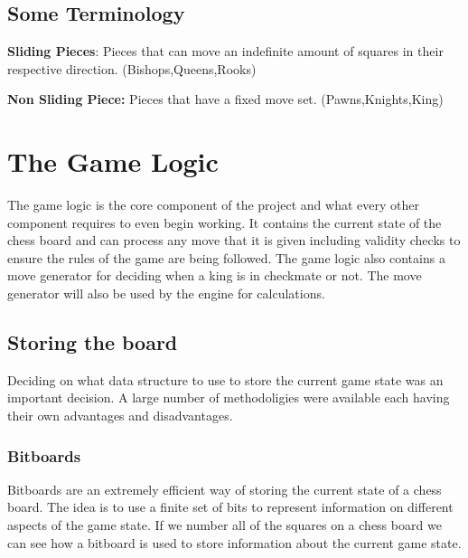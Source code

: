 \documentclass[11pt]{report}
\begin{document}
\tableofcontents

\section{Some Terminology}

\textbf{Sliding Pieces}: Pieces that can move an indefinite amount of squares in their respective direction. (Bishops,Queens,Rooks) \newline

\textbf{Non Sliding Piece:} Pieces that have a fixed move set. (Pawns,Knights,King)

\chapter{The Game Logic}

The game logic is the core component of the project and what every other component requires to even begin working. It contains the current state of the chess board and can process any move that it is given including validity checks to ensure the rules of the game are being followed. The game logic also contains a move generator for deciding when a king is in checkmate or not. The move generator will also be used by the engine for calculations.\newline

\section{Storing the board}

Deciding on what data structure to use to store the current game state was an important decision. A large number of methodoligies were available each having their own advantages and disadvantages.

\subsection{Bitboards}

Bitboards are an extremely efficient way of storing the current state of a chess board. The idea is to use a finite set of bits to represent information on different aspects of the game state. If we number all of the squares on a chess board we can see how a bitboard is used to store information about the current game state. \newline
\end{document}
